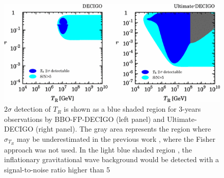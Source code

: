 \documentclass[11pt,a4paper,twoside]{book}
\begin{document}
\begin{figure}[]
	\centering
	\includegraphics[width=0.8\linewidth, height=0.25\textheight]{Images/Chap3/Kurojanagi_Nakayama_Fig6}
	\caption{$ 2\sigma $ detection of $ T_{R} $ is shown as a blue shaded region for 3-years observations by BBO-FP-DECIGO (left panel) and Ultimate-DECIGO (right panel). The gray area represents the region where $ \sigma_{T_{R}} $ may be underestimated in the previous work \cite{Chap3:ProibingReheatingTemperature2008}, where the Fisher approach was not used. In the light blue shaded region , the inflationary gravitational wave background would be detected with a signal-to-noise ratio higher than 5}
	\label{fig:kurojanaginakayamafig6}
\end{figure}
\end{document}
